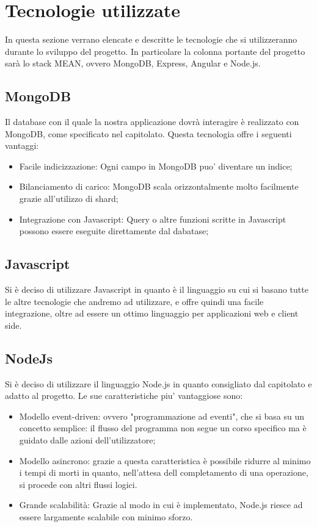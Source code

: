 \newpage
\section{Tecnologie utilizzate}
In questa sezione verrano elencate e descritte le tecnologie che si utilizzeranno durante lo sviluppo del progetto. In particolare la colonna portante del progetto sar\`{a} lo stack MEAN, ovvero MongoDB, Express, Angular e Node.js.

\subsection{MongoDB}
Il database con il quale la nostra applicazione dovrà interagire è realizzato con MongoDB, come specificato nel capitolato. Questa tecnologia offre i seguenti vantaggi:
\begin{itemize}
\item Facile indicizzazione: Ogni campo in MongoDB puo' diventare un indice;
\item Bilanciamento di carico: MongoDB scala orizzontalmente molto facilmente grazie all'utilizzo di shard;
\item Integrazione con Javascript: Query o altre funzioni scritte in Javascript possono essere eseguite direttamente dal dabatase;
\end{itemize}

\subsection{Javascript}
Si è deciso di utilizzare Javascript in quanto è il linguaggio su cui si basano tutte le altre tecnologie che andremo ad utilizzare, e offre quindi una facile integrazione, oltre ad essere un ottimo linguaggio per applicazioni web e client side.


\subsection{NodeJs}
Si è deciso di utilizzare il linguaggio Node.js in quanto consigliato dal capitolato e adatto al progetto. Le sue caratteristiche piu' vantaggiose sono:
\begin{itemize}
\item Modello event-driven: ovvero "programmazione ad eventi", che si basa su un concetto semplice: il flusso del programma non segue un corso specifico ma è guidato dalle azioni dell'utilizzatore;
\item Modello asincrono: grazie a questa caratteristica è possibile ridurre al minimo i tempi di morti in quanto, nell’attesa dell completamento di una operazione, si procede con altri flussi logici. 
\item Grande scalabilità: Grazie al modo in cui è implementato, Node.js riesce ad essere largamente scalabile con minimo sforzo.
\end{itemize}

